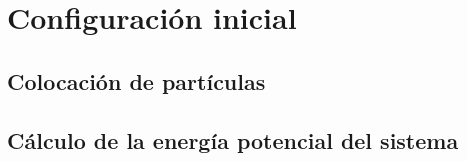 \chapter{Configuración inicial}

\section{Colocación de partículas}

\section{Cálculo de la energía potencial del sistema}


